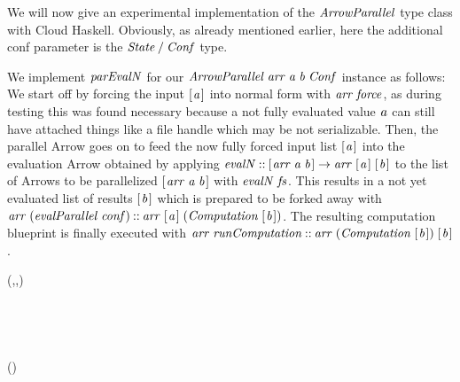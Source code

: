 \documentclass[paper=A4,twoside=true,openright,parskip=full,chapterprefix=true,headings=normal,bibliography=totoc,listof=totoc,titlepage=on,captions=tableabove,draft=false,british]{scrreprt}%
\begin{document}
We will now give an experimental implementation of the \ensuremath{\Conid{ArrowParallel}}
type class with Cloud Haskell. Obviously, as already mentioned earlier,
here the additional conf parameter is the \ensuremath{\Conid{State}\mathbin{/}\Conid{Conf}} type.

We implement \ensuremath{\Varid{parEvalN}} for our \ensuremath{\Conid{ArrowParallel}\;\Varid{arr}\;\Varid{a}\;\Varid{b}\;\Conid{Conf}} instance as
follows: We start off by forcing the input \ensuremath{[\mskip1.5mu \Varid{a}\mskip1.5mu]} into normal form with
\ensuremath{\Varid{arr}\;\Varid{force}}, as during testing this was found necessary because a not
fully evaluated value \ensuremath{\Varid{a}} can still have attached things like a file
handle which may be not serializable. Then, the parallel Arrow goes on
to feed the now fully forced input list \ensuremath{[\mskip1.5mu \Varid{a}\mskip1.5mu]} into the evaluation Arrow
obtained by applying \ensuremath{\Varid{evalN}\mathbin{::}[\mskip1.5mu \Varid{arr}\;\Varid{a}\;\Varid{b}\mskip1.5mu]\to \Varid{arr}\;[\mskip1.5mu \Varid{a}\mskip1.5mu]\;[\mskip1.5mu \Varid{b}\mskip1.5mu]} to the list of
Arrows to be parallelized \ensuremath{[\mskip1.5mu \Varid{arr}\;\Varid{a}\;\Varid{b}\mskip1.5mu]} with \ensuremath{\Varid{evalN}\;\Varid{fs}}. This results in a
not yet evaluated list of results \ensuremath{[\mskip1.5mu \Varid{b}\mskip1.5mu]} which is prepared to be forked
away with \ensuremath{\Varid{arr}\;(\Varid{evalParallel}\;\Varid{conf})\mathbin{::}\Varid{arr}\;[\mskip1.5mu \Varid{a}\mskip1.5mu]\;(\Conid{Computation}\;[\mskip1.5mu \Varid{b}\mskip1.5mu])}. The
resulting computation blueprint is finally executed with
\ensuremath{\Varid{arr}\;\Varid{runComputation}\mathbin{::}\Varid{arr}\;(\Conid{Computation}\;[\mskip1.5mu \Varid{b}\mskip1.5mu])\;[\mskip1.5mu \Varid{b}\mskip1.5mu]}.


\begin{hscode}\SaveRestoreHook
{}%
%
%
%
%
\>[B]{}\;(\;,\;,\;)\Rightarrow {}\<[E]%
\\
\>[B]{}\<[4]%
\>[4]{}\;\;\;\;\;\<[E]%
\\
\>[4]{}\<[5]%
\>[5]{}\;\;\mathrel{=}{}\<[E]%
\\
\>[5]{}\<[9]%
\>[9]{}\;\mathbin{>\!\!>\!\!>}{}\<[E]%
\\
\>[5]{}\<[9]%
\>[9]{}\;\mathbin{>\!\!>\!\!>}{}\<[E]%
\\
\>[5]{}\<[9]%
\>[9]{}\;(\;)\mathbin{>\!\!>\!\!>}{}\<[E]%
\\
\>[5]{}\<[9]%
\>[9]{}\;\<[E]%
\ColumnHook
\end{hscode}\resethooks
\vspace{-2\baselineskip}
\end{document}
